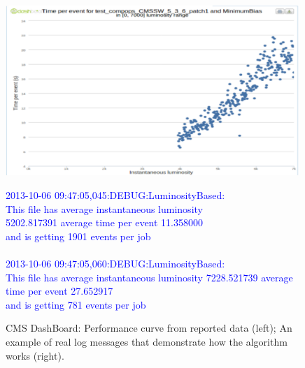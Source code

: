 \documentclass[a4paper]{jpconf}
\begin{document}
\begin{figure}[ht]
  \begin{center}
\begin{minipage}[t]{0.59\textwidth}
\vspace{0pt}\raggedright
\includegraphics[width=0.99\textwidth,height=0.80\textwidth]{16.pdf}
\end{minipage}
\begin{minipage}[t]{0.40\textwidth}
\vspace{0pt}\raggedright
  \begin{flushleft}
    \textcolor{blue}{
    \small
2013-10-06 09:47:05,045:DEBUG:LuminosityBased:\\
This file has average instantaneous luminosity\\
5202.817391 average time per event 11.358000\\
and is getting 1901 events per job\\
\ \\
2013-10-06 09:47:05,060:DEBUG:LuminosityBased:\\
This file has average instantaneous luminosity
7228.521739 average time per event 27.652917\\
and is getting 781 events per job\\
}
  \end{flushleft}
\end{minipage}
\caption{\label{fig5} CMS DashBoard: Performance curve from reported data (left); An example of real log messages that demonstrate how the algorithm works (right).}
  \end{center}
\vspace{-8mm}
\end{figure}
\end{document}
